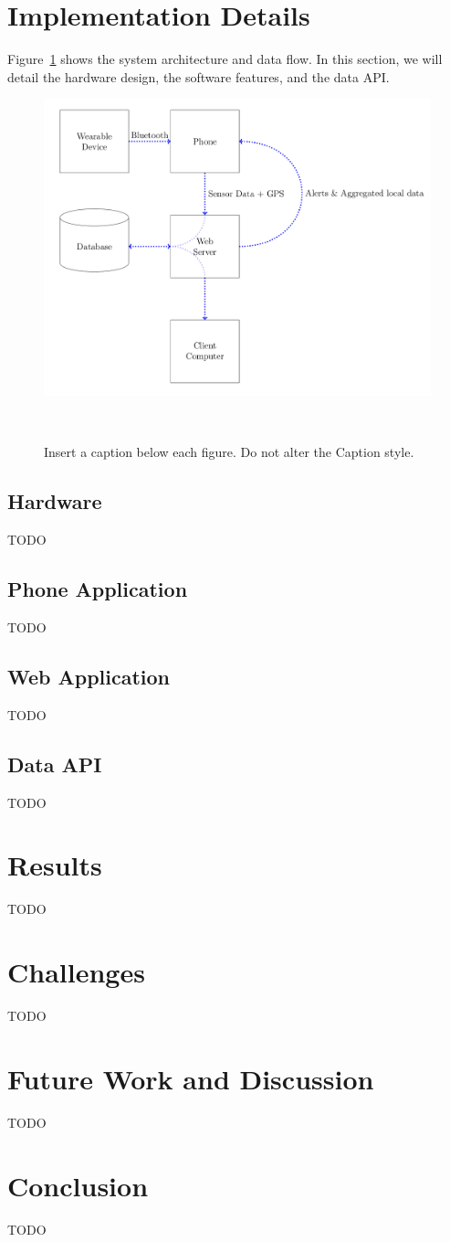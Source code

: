 \documentclass{sigchi}
\begin{document}
\section{Implementation Details}
Figure~\ref{fig:software block} shows the system architecture and data flow.
In this section, we will detail the hardware design, the software features, and the data API.
\begin{figure}
    \centering
    \includegraphics[width=0.9\columnwidth]{figures/Software-Block-Diagram.jpg}
    \caption{Insert a caption below each figure. Do not alter the Caption style.}
    ~\label{fig:software block}
\end{figure}

\subsection{Hardware}
TODO

\subsection{Phone Application}
TODO

\subsection{Web Application}
TODO

\subsection{Data API}
TODO

\section{Results}
TODO

\section{Challenges}
TODO

\section{Future Work and Discussion}
TODO

\section{Conclusion}
TODO

\balance{}



\end{document}
